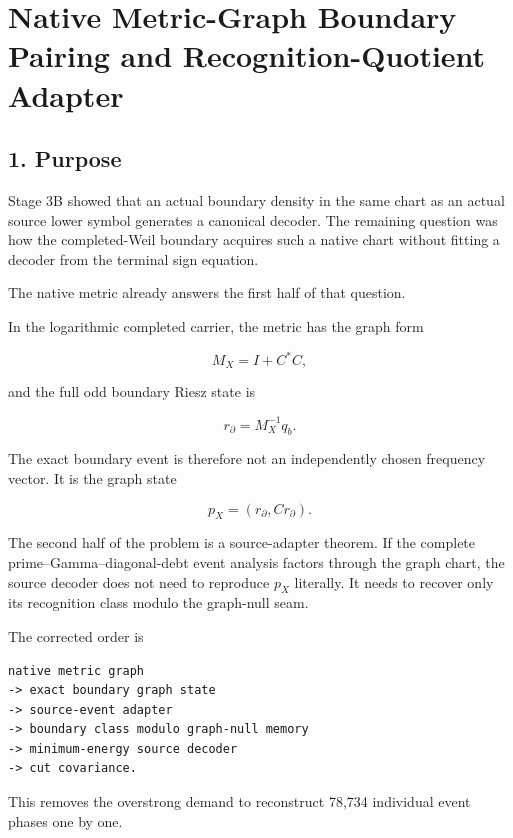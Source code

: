 \hypertarget{native-metric-graph-boundary-pairing-and-recognition-quotient-adapter}{%
\chapter{Native Metric-Graph Boundary Pairing and Recognition-Quotient Adapter}\label{native-metric-graph-boundary-pairing-and-recognition-quotient-adapter}}

\hypertarget{purpose}{%
\section{1. Purpose}\label{purpose}}

Stage 3B showed that an actual boundary density in the same chart as an actual
source lower symbol generates a canonical decoder. The remaining question was
how the completed-Weil boundary acquires such a native chart without fitting a
decoder from the terminal sign equation.

The native metric already answers the first half of that question.

In the logarithmic completed carrier, the metric has the graph form

\[
M_X=I+C^*C,
\]

and the full odd boundary Riesz state is

\[
r_\partial=M_X^{-1}q_b.
\]

The exact boundary event is therefore not an independently chosen frequency
vector. It is the graph state

\[
\boxed{
p_X=(r_\partial,Cr_\partial).
}
\]

The second half of the problem is a source-adapter theorem. If the complete
prime--Gamma--diagonal-debt event analysis factors through the graph chart, the
source decoder does not need to reproduce \(p_X\) literally. It needs to
recover only its recognition class modulo the graph-null seam.

The corrected order is

\begin{verbatim}
native metric graph
-> exact boundary graph state
-> source-event adapter
-> boundary class modulo graph-null memory
-> minimum-energy source decoder
-> cut covariance.
\end{verbatim}

This removes the overstrong demand to reconstruct 78,734 individual event
phases one by one.

